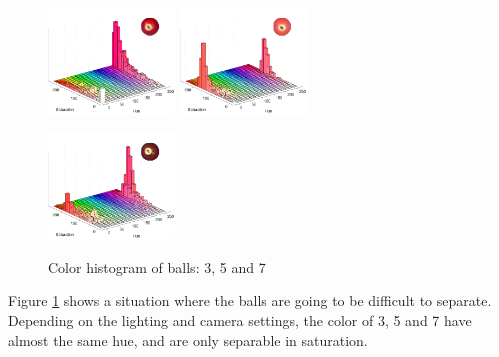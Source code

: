 \begin{figure}[H]
\centering
\subfloat
{
	\includegraphics[width=0.3\textwidth]{images/ballhist/3}
}
\subfloat
{
	\includegraphics[width=0.3\textwidth]{images/ballhist/5}
}

\subfloat
{
	\includegraphics[width=0.3\textwidth]{images/ballhist/7}
}

\caption{Color histogram of balls: 3, 5 and 7}
\label{fig:ballhist-3-7}
\end{figure} 
Figure \ref{fig:ballhist-3-7} shows a situation where the balls are going to be difficult to separate. Depending on the lighting and camera settings, the color of 3, 5 and 7 have almost the same hue, and are only separable in saturation.

